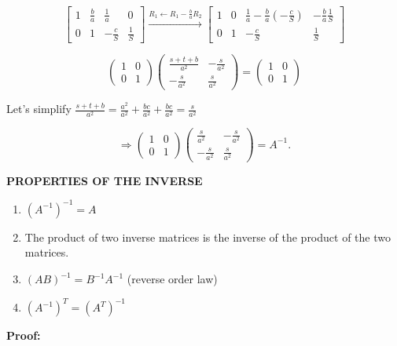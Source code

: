 \documentclass[a4paper, 12pt]{article}
\begin{document}
\[\begin{bmatrix}
1 & \frac{b}{a} & \frac{1}{a} & 0 \\
0 & 1 & -\frac{c}{S} & \frac{1}{S}
\end{bmatrix} \xrightarrow{R_1 \leftarrow R_1 - \frac{b}{a}R_2}
\begin{bmatrix}
1 & 0 & \frac{1}{a} - \frac{b}{a}\left(-\frac{c}{S}\right) & -\frac{b}{a}\frac{1}{S} \\
0 & 1 & -\frac{c}{S} & \frac{1}{S}
\end{bmatrix}\]

\begin{equation*}
\begin{pmatrix}
1 & 0 \\
0 & 1
\end{pmatrix}
\begin{pmatrix}
\frac{s+t+b}{a^2} & -\frac{s}{a^2} \\
-\frac{s}{a^2} & \frac{s}{a^2}
\end{pmatrix}
=
\begin{pmatrix}
1 & 0 \\
0 & 1
\end{pmatrix}
\end{equation*}

Let's simplify $\frac{s+t+b}{a^2} = \frac{a^2}{a^2} + \frac{bc}{a^2} + \frac{bc}{a^2} = \frac{s}{a^2}$

\begin{equation*}
\Rightarrow
\begin{pmatrix}
1 & 0 \\
0 & 1
\end{pmatrix}
\begin{pmatrix}
\frac{s}{a^2} & -\frac{s}{a^2} \\
-\frac{s}{a^2} & \frac{s}{a^2}
\end{pmatrix}
= A^{-1}.
\end{equation*}

\textbf{PROPERTIES OF THE INVERSE}

\begin{enumerate}
\item $(A^{-1})^{-1} = A$
\item The product of two inverse matrices is the inverse of the product of the two matrices.
\item $(AB)^{-1} = B^{-1}A^{-1}$ \quad (reverse order law)
\item $(A^{-1})^T = (A^T)^{-1}$
\end{enumerate}

\textbf{Proof:}
\end{document}
